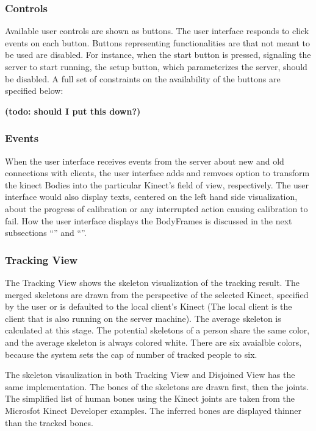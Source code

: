 \documentclass{sigchi}
\begin{document}
\subsubsection{Controls}

Available user controls are shown as buttons. The user interface responds to click events on each button. Buttons representing functionalities are that not meant to be used are disabled. For instance, when the start button is pressed, signaling the server to start running, the setup button, which parameterizes the server, should be disabled. A full set of constraints on the availability of the buttons are specified below:

\textbf{(todo: should I put this down?)}

\subsubsection{Events}

When the user interface receives events from the server about new and old connections with clients, the user interface adds and remvoes option to transform the kinect Bodies into the particular Kinect's field of view, respectively. The user interface would also display texts, centered on the left hand side visualization, about the progress of calibration or any interrupted action causing calibration to fail. How the user interface displays the BodyFrames is discussed in the next subsections  ``'' and ``''.

\subsubsection{Tracking View}
\label{subsec:tracking_view}

The Tracking View shows the skeleton visualization of the tracking result. The merged skeletons are drawn from the perspective of the selected Kinect, specified by the user or is defaulted to the local client's Kinect (The local client is the client that is also running on the server machine). The average skeleton is calculated at this stage. The potential skeletons of a person share the same color, and the average skeleton is always colored white. There are six avaialble colors, because the system sets the cap of number of tracked people to six.

The skeleton visaulization in both Tracking View and Disjoined View has the same implementation. The bones of the skeletons are drawn first, then the joints. The simplified list of human bones using the Kinect joints are taken from the Microsfot Kinect Developer examples. The inferred bones are displayed thinner than the tracked bones.
\end{document}
